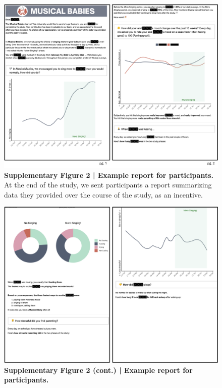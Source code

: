 \documentclass[
]{article}
\begin{document}
\begin{figure}[H]

{\centering \includegraphics[width=0.9\linewidth,]{../viz/s_figure2a} 

}

\caption{\textbf{Supplementary Figure 2 | Example report for participants.} At the end of the study, we sent participants a report summarizing data they provided over the course of the study, as an incentive.}\label{fig:supp fig 2}
\end{figure}
\begin{figure}[H]

{\centering \includegraphics[width=0.9\linewidth,]{../viz/s_figure2b} 

}

\caption{\textbf{Supplementary Figure 2 (cont.) | Example report for participants.}}\label{fig:supp fig 2b}
\end{figure}
\end{document}
